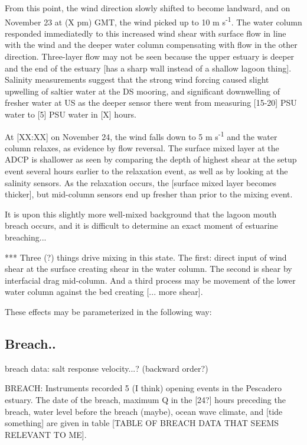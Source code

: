 From this point, the wind direction slowly shifted to become landward,
and on November 23 at (X pm) GMT, the wind picked up to 10 m
s\textsuperscript{-1}. The water column responded immediatedly to this
increased wind shear with surface flow in line with the wind and the
deeper water column compensating with flow in the other direction.
Three-layer flow may not be seen because the upper estuary is deeper and
the end of the estuary [has a sharp wall instead of a shallow lagoon
thing]. Salinity measurements suggest that the strong wind forcing
caused slight upwelling of saltier water at the DS mooring, and
significant downwelling of fresher water at US as the deeper sensor
there went from measuring [15-20] PSU water to [5] PSU water in [X]
hours.

At [XX:XX] on November 24, the wind falls down to 5 m
s\textsuperscript{-1} and the water column relaxes, as evidence by flow
reversal. The surface mixed layer at the ADCP is shallower as seen by
comparing the depth of highest shear at the setup event several hours
earlier to the relaxation event, as well as by looking at the salinity
sensors. As the relaxation occurs, the [surface mixed layer becomes
thicker], but mid-column sensors end up fresher than prior to the mixing
event.

It is upon this slightly more well-mixed background that the lagoon
mouth breach occurs, and it is difficult to determine an exact moment of
estuarine breaching...

*** Three (?) things drive mixing in this state. The first: direct input
of wind shear at the surface creating shear in the water column.  The
second is shear by interfacial drag mid-column. And a third process may
be movement of the lower water column against the bed creating [... more
shear].

These effects may be parameterized in the following way:



\subsection{Breach.. } \label{breach_dynamics}

breach data: salt response
velocity...? (backward order?)


BREACH: Instruments recorded 5 (I think) opening events in the Pescadero
estuary. The date of the breach, maximum Q in the [24?] hours preceding
the breach, water level before the breach (maybe), ocean wave climate,
and [tide something] are given in table [TABLE OF BREACH DATA THAT SEEMS
RELEVANT TO ME].

